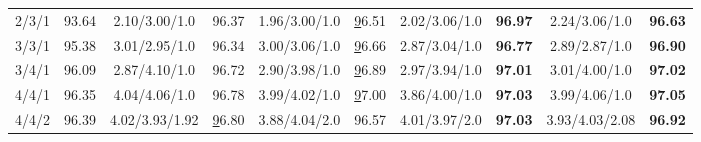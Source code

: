 \begin{table}[t]
\begin{adjustbox}{max width=0.49\textwidth}
\begin{threeparttable}
\begin{tabular}{c|c|cc||cc|cc|cc}
2/3/1          & 93.64             & 2.10/3.00/1.0   & 96.37           & 1.96/3.00/1.0                                  & {\ul 96.51}                                   & 2.02/3.06/1.0                     & {  \textbf{96.97}}                    & 2.24/3.06/1.0                     & {\color[HTML]{9B9B9B} \textbf{96.63}}                   \\
3/3/1          & 95.38             & 3.01/2.95/1.0   & 96.34           & 3.00/3.06/1.0                                  & {\ul 96.66}                                   & 2.87/3.04/1.0                     & {\color[HTML]{9B9B9B} \textbf{96.77}}                    & 2.89/2.87/1.0                     & \textbf{96.90}                                          \\
3/4/1          & 96.09             & 2.87/4.10/1.0   & 96.72           & 2.90/3.98/1.0                                  & {\ul 96.89}                                   & 2.97/3.94/1.0                     & {\color[HTML]{9B9B9B} \textbf{97.01}}                    & 3.01/4.00/1.0                     & \textbf{97.02}                                          \\
4/4/1          & 96.35             & 4.04/4.06/1.0   & 96.78           & 3.99/4.02/1.0                                  & {\ul 97.00}                                   & 3.86/4.00/1.0                     & {\color[HTML]{9B9B9B} \textbf{97.03}}                    & 3.99/4.06/1.0                     & \textbf{97.05}                                          \\
4/4/2          & 96.39             & 4.02/3.93/1.92  & {\ul 96.80}     & 3.88/4.04/2.0                                  & 96.57                                         & 4.01/3.97/2.0                     & {  \textbf{97.03}}                    & 3.93/4.03/2.08                    & {\color[HTML]{9B9B9B} \textbf{96.92}}                   \\ \bottomrule
\end{tabular}
\end{threeparttable}
\end{adjustbox}
\end{table}
